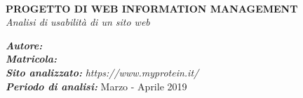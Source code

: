 \begin{titlepage}
	\HRule \\[0.4cm]
	{ \huge \bfseries PROGETTO DI WEB INFORMATION MANAGEMENT}\\[0.6cm] %
	{ \huge \emph{Analisi di usabilità di un sito web} }
	\HRule \\[1cm]
	
	
	\vspace{1cm}
	
	\begin{minipage}{0.5\textwidth}
		\begin{flushleft} 
			\center
			\emph{\bfseries Autore: }\nomeStudente\ \cognomeStudente\ \\
			\emph{\bfseries Matricola: }\matricolaStudente \\
			\emph{\bfseries Sito analizzato: } \textit{https://www.myprotein.it/} \\
			\emph{\bfseries Periodo di analisi: } Marzo - Aprile 2019
		\end{flushleft}
	\end{minipage}
	
\end{titlepage}

\tableofcontents
\newpage
